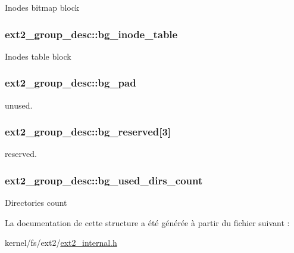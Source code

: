 \-Inodes bitmap block \hypertarget{structext2__group__desc_abf527c572a5fe30354cdf2cfc4f88b26}{
\subsubsection[{bg\-\_\-inode\-\_\-table}]{ {\bf ext2\-\_\-group\-\_\-desc\-::bg\-\_\-inode\-\_\-table}}}\label{structext2__group__desc_abf527c572a5fe30354cdf2cfc4f88b26}
\-Inodes table block \hypertarget{structext2__group__desc_ac99983cee73aa4aace5c7d51b6d5a7e1}{
\subsubsection[{bg\-\_\-pad}]{ {\bf ext2\-\_\-group\-\_\-desc\-::bg\-\_\-pad}}}\label{structext2__group__desc_ac99983cee73aa4aace5c7d51b6d5a7e1}
unused. \hypertarget{structext2__group__desc_aff7f7dc0b67aed284218b238991f5c93}{
\subsubsection[{bg\-\_\-reserved}]{ {\bf ext2\-\_\-group\-\_\-desc\-::bg\-\_\-reserved}\mbox{[}3\mbox{]}}}\label{structext2__group__desc_aff7f7dc0b67aed284218b238991f5c93}
reserved. \hypertarget{structext2__group__desc_adc9924671cb04dd63b4b7ffff8c262dc}{
\subsubsection[{bg\-\_\-used\-\_\-dirs\-\_\-count}]{ {\bf ext2\-\_\-group\-\_\-desc\-::bg\-\_\-used\-\_\-dirs\-\_\-count}}}\label{structext2__group__desc_adc9924671cb04dd63b4b7ffff8c262dc}
\-Directories count 

\-La documentation de cette structure a été générée à partir du fichier suivant \-:\begin{DoxyCompactItemize}
\item 
kernel/fs/ext2/\hyperlink{ext2__internal_8h}{ext2\-\_\-internal.\-h}\end{DoxyCompactItemize}
